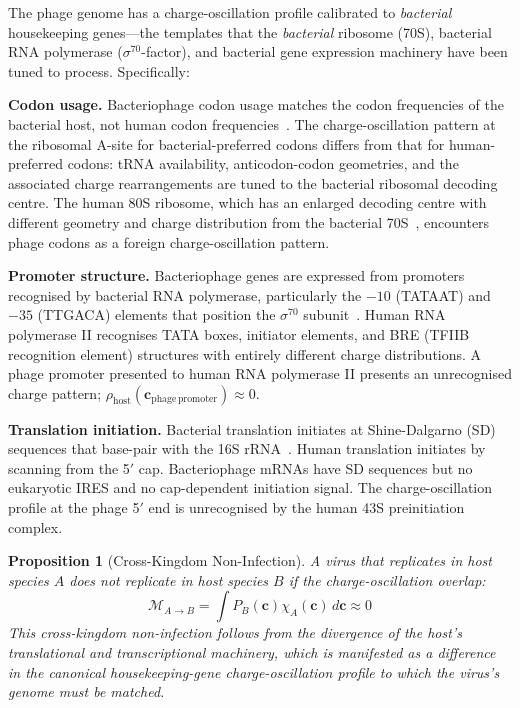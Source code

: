 \documentclass[11pt,twocolumn,a4paper]{article}
\newtheorem{proposition}[theorem]{Proposition}
\theoremstyle{definition}
\theoremstyle{remark}
\newcommand{\Phost}{\rho_{\mathrm{host}}}
\newcommand{\vv}[1]{\boldsymbol{#1}}
\begin{document}
The phage genome has a charge-oscillation profile calibrated to \emph{bacterial} housekeeping genes---the templates that the \emph{bacterial} ribosome (70S), bacterial RNA polymerase ($\sigma^{70}$-factor), and bacterial gene expression machinery have been tuned to process. Specifically:

\textbf{Codon usage.} Bacteriophage codon usage matches the codon frequencies of the bacterial host, not human codon frequencies~\cite{Karlin2001,Nakamura2000}. The charge-oscillation pattern at the ribosomal A-site for bacterial-preferred codons differs from that for human-preferred codons: tRNA availability, anticodon-codon geometries, and the associated charge rearrangements are tuned to the bacterial ribosomal decoding centre. The human 80S ribosome, which has an enlarged decoding centre with different geometry and charge distribution from the bacterial 70S~\cite{Melnikov2012}, encounters phage codons as a foreign charge-oscillation pattern.

\textbf{Promoter structure.} Bacteriophage genes are expressed from promoters recognised by bacterial RNA polymerase, particularly the $-10$ (TATAAT) and $-35$ (TTGACA) elements that position the $\sigma^{70}$ subunit~\cite{Haugen2008}. Human RNA polymerase II recognises TATA boxes, initiator elements, and BRE (TFIIB recognition element) structures with entirely different charge distributions. A phage promoter presented to human RNA polymerase II presents an unrecognised charge pattern; $\Phost(\vv{c}_{\mathrm{phage\,promoter}}) \approx 0$.

\textbf{Translation initiation.} Bacterial translation initiates at Shine-Dalgarno (SD) sequences that base-pair with the 16S rRNA~\cite{Shine1975}. Human translation initiates by scanning from the 5$'$ cap. Bacteriophage mRNAs have SD sequences but no eukaryotic IRES and no cap-dependent initiation signal. The charge-oscillation profile at the phage 5$'$ end is unrecognised by the human 43S preinitiation complex.

\begin{proposition}[Cross-Kingdom Non-Infection]
\label{prop:cross_kingdom}
A virus that replicates in host species $A$ does not replicate in host species $B$ if the charge-oscillation overlap:
\begin{equation}
  \mathcal{M}_{A \to B} = \int P_B(\vv{c}) \chi_A(\vv{c})\,d\vv{c} \approx 0
\end{equation}
This cross-kingdom non-infection follows from the divergence of the host's translational and transcriptional machinery, which is manifested as a difference in the canonical housekeeping-gene charge-oscillation profile to which the virus's genome must be matched.
\end{proposition}
\end{document}
